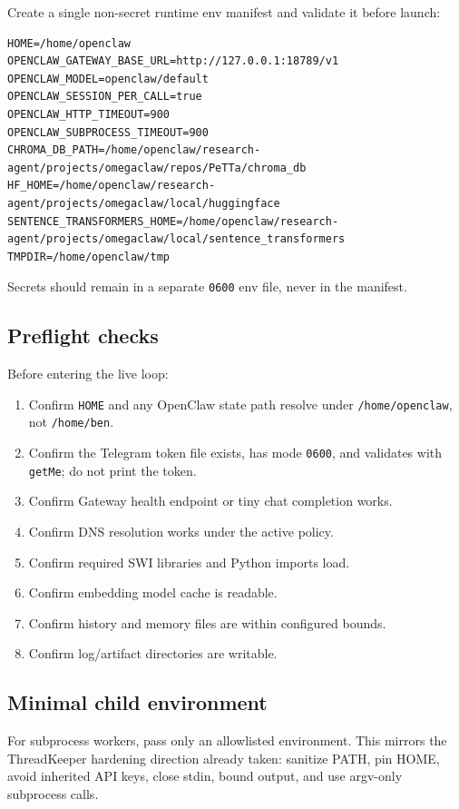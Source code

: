 \documentclass[11pt]{article}
\begin{document}
Create a single non-secret runtime env manifest and validate it before launch:

\begin{Verbatim}[fontsize=\small]
HOME=/home/openclaw
OPENCLAW_GATEWAY_BASE_URL=http://127.0.0.1:18789/v1
OPENCLAW_MODEL=openclaw/default
OPENCLAW_SESSION_PER_CALL=true
OPENCLAW_HTTP_TIMEOUT=900
OPENCLAW_SUBPROCESS_TIMEOUT=900
CHROMA_DB_PATH=/home/openclaw/research-agent/projects/omegaclaw/repos/PeTTa/chroma_db
HF_HOME=/home/openclaw/research-agent/projects/omegaclaw/local/huggingface
SENTENCE_TRANSFORMERS_HOME=/home/openclaw/research-agent/projects/omegaclaw/local/sentence_transformers
TMPDIR=/home/openclaw/tmp
\end{Verbatim}

Secrets should remain in a separate \texttt{0600} env file, never in the manifest.

\subsection{Preflight checks}

Before entering the live loop:

\begin{enumerate}
  \item Confirm \texttt{HOME} and any OpenClaw state path resolve under \texttt{/home/openclaw}, not \texttt{/home/ben}.
  \item Confirm the Telegram token file exists, has mode \texttt{0600}, and validates with \texttt{getMe}; do not print the token.
  \item Confirm Gateway health endpoint or tiny chat completion works.
  \item Confirm DNS resolution works under the active policy.
  \item Confirm required SWI libraries and Python imports load.
  \item Confirm embedding model cache is readable.
  \item Confirm history and memory files are within configured bounds.
  \item Confirm log/artifact directories are writable.
\end{enumerate}

\subsection{Minimal child environment}

For subprocess workers, pass only an allowlisted environment. This mirrors the ThreadKeeper hardening direction already taken: sanitize PATH, pin HOME, avoid inherited API keys, close stdin, bound output, and use argv-only subprocess calls.
\end{document}
